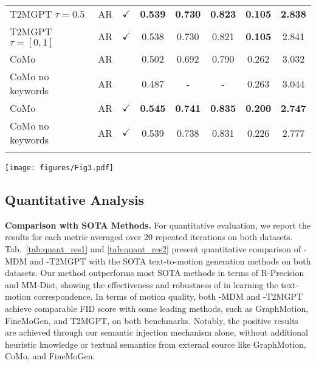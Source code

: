 \begin{table}[t!]
\begin{tabular}{llcccccc}
T2MGPT $\tau=0.5$ & AR & $\checkmark$ & \textbf{0.539} & \textbf{0.730} & \textbf{0.823} & \textbf{0.105} & \textbf{2.838}  \\
T2MGPT $\tau=[0,1]$ & AR & $\checkmark$ & 0.538 & 0.730 & 0.821 & \textbf{0.105} & 2.841  \\
\midrule
CoMo  & AR & & 0.502 & 0.692 & 0.790 & 0.262 & 3.032  \\
CoMo no keywords  & AR & & 0.487 & - & - & 0.263 & 3.044  \\
CoMo  & AR & $\checkmark$ & \textbf{0.545} & \textbf{0.741} & \textbf{0.835} & \textbf{0.200} & \textbf{2.747}  \\
CoMo no keywords  & AR & $\checkmark$ & 0.539 & 0.738 & 0.831 & 0.226 & 2.777  \\
\bottomrule
\label{tab:quant_res5}
\vspace{-10pt}
\end{tabular}
\end{table}



\begin{figure*}[!t]
    \centering
    \texttt{[image: figures/Fig3.pdf]}
    \vspace{-15pt}
    \vspace{-5pt}
\label{fig:qual_res}
\end{figure*}

\vspace{-3pt}
\subsection{Quantitative Analysis} 
\label{sub:quantitative}
\vspace{-3pt}

\textbf{Comparison with SOTA Methods.}
For quantitative evaluation, we report the results for each metric averaged over 20 repeated iterations on both datasets. 
Tab.~\ref{tab:quant_res1} and \ref{tab:quant_res2} present quantitative comparison of {\modulename}-MDM and {\modulename}-T2MGPT with the SOTA text-to-motion generation methods on both datasets.
Our method outperforms most SOTA methods in terms of R-Precision and MM-Dist, showing the effectiveness and robustness of {\modulename} in learning the text-motion correspondence.
In terms of motion quality, both {\modulename}-MDM and {\modulename}-T2MGPT achieve comparable FID score with some leading methods, such as GraphMotion, FineMoGen, and T2MGPT, on both benchmarks. 
Notably, the positive results are achieved through our semantic injection mechanism alone, without additional heuristic knowledge or textual semantics from external source like GraphMotion, CoMo, and FineMoGen.


